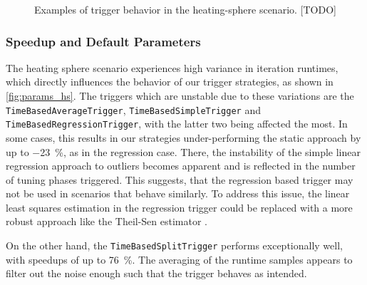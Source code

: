 \begin{figure}[htpb]
\begin{subfigure}[c]{0.5\textwidth}
	\end{subfigure}
	\caption{Examples of trigger behavior in the heating-sphere scenario. [TODO]}
	\label{fig:hs_trigger_behavior}
\end{figure}



\subsubsection{Speedup and Default Parameters}
The heating sphere scenario experiences high variance in iteration runtimes, which directly influences the behavior of our trigger strategies, as shown in \autoref{fig:params_hs}.
The triggers which are unstable due to these variations are the \texttt{TimeBasedAverageTrigger}, \texttt{TimeBasedSimpleTrigger} and \texttt{TimeBasedRegressionTrigger}, with the latter two being affected the most. In some cases, this results in our strategies under-performing the static approach by up to \qty{-23}{\percent}, as in the regression case. There, the instability of the simple linear regression approach to outliers becomes apparent and is reflected in the number of tuning phases triggered. This suggests, that the regression based trigger may not be used in scenarios that behave similarly. To address this issue, the linear least squares estimation in the regression trigger could be replaced with a more robust approach like the Theil-Sen estimator \cite{Wilcox2012}.

On the other hand, the \texttt{TimeBasedSplitTrigger} performs exceptionally well, with speedups of up to \qty{76}{\percent}. The averaging of the runtime samples appears to filter out the noise enough such that the trigger behaves as intended.


